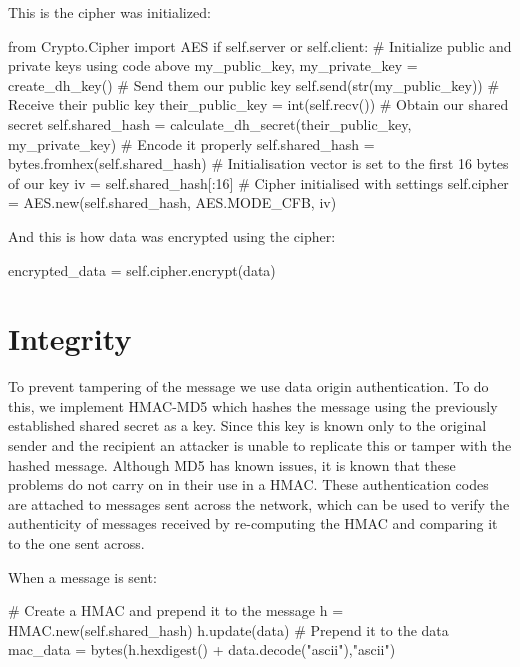 \documentclass[9pt,a4paper]{article}
\begin{document}
This is the cipher was initialized:
\begin{center}
\begin{python}
from Crypto.Cipher import AES
if self.server or self.client:
    # Initialize public and private keys using code above
    my_public_key, my_private_key = create_dh_key()
    # Send them our public key
    self.send(str(my_public_key))
    # Receive their public key
    their_public_key = int(self.recv())
    # Obtain our shared secret
    self.shared_hash = calculate_dh_secret(their_public_key, my_private_key)
    # Encode it properly
    self.shared_hash = bytes.fromhex(self.shared_hash)
# Initialisation vector is set to the first 16 bytes of our key
iv = self.shared_hash[:16]
# Cipher initialised with settings
self.cipher = AES.new(self.shared_hash, AES.MODE_CFB, iv)
\end{python}
\end{center}
And this is how data was encrypted using the cipher:
\begin{center}\begin{python}
encrypted_data = self.cipher.encrypt(data)
\end{python}\end{center}

\section{Integrity}
To prevent tampering of the message we use data origin authentication. To do this, we implement HMAC-MD5 which hashes the message using the previously established shared secret as a key. Since this key is known only to the original sender and the recipient an attacker is unable to replicate this or tamper with the hashed message. Although MD5 has known issues, it is known that these problems do not carry on in their use in a HMAC. These authentication codes are attached to messages sent across the network, which can be used to verify the authenticity of messages received by re-computing the HMAC and comparing it to the one sent across.

When a message is sent:
\begin{center}\begin{python}
# Create a HMAC and prepend it to the message
h = HMAC.new(self.shared_hash)
h.update(data)
# Prepend it to the data
mac_data = bytes(h.hexdigest() + data.decode("ascii"),"ascii")
\end{python}\end{center}
\end{document}
